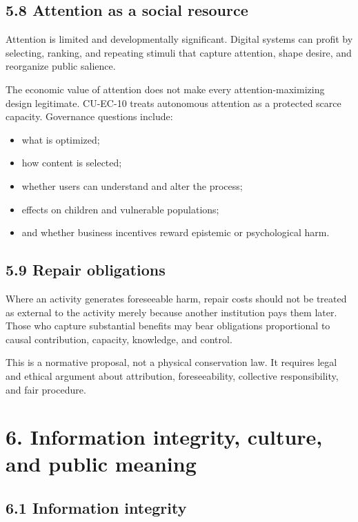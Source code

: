 \documentclass[
  11pt,
]{article}
\providecommand{\tightlist}{%
  \setlength{\itemsep}{0pt}\setlength{\parskip}{0pt}}
\begin{document}
\subsection{5.8 Attention as a social
resource}\label{attention-as-a-social-resource}

Attention is limited and developmentally significant. Digital systems
can profit by selecting, ranking, and repeating stimuli that capture
attention, shape desire, and reorganize public salience.

The economic value of attention does not make every attention-maximizing
design legitimate. CU-EC-10 treats autonomous attention as a protected
scarce capacity. Governance questions include:

\begin{itemize}
\tightlist
\item
  what is optimized;
\item
  how content is selected;
\item
  whether users can understand and alter the process;
\item
  effects on children and vulnerable populations;
\item
  and whether business incentives reward epistemic or psychological
  harm.
\end{itemize}

\subsection{5.9 Repair obligations}\label{repair-obligations}

Where an activity generates foreseeable harm, repair costs should not be
treated as external to the activity merely because another institution
pays them later. Those who capture substantial benefits may bear
obligations proportional to causal contribution, capacity, knowledge,
and control.

This is a normative proposal, not a physical conservation law. It
requires legal and ethical argument about attribution, foreseeability,
collective responsibility, and fair procedure.

\section{6. Information integrity, culture, and public
meaning}\label{information-integrity-culture-and-public-meaning}

\subsection{6.1 Information integrity}\label{information-integrity}
\end{document}
